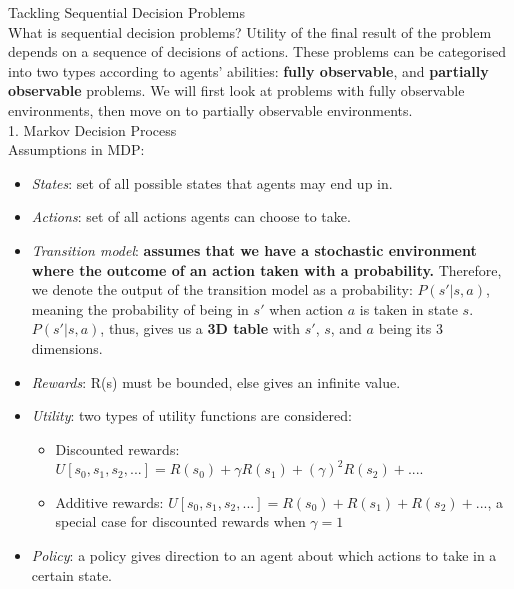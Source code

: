 \documentclass[12pt]{article}
\begin{document}
\noindent

\noindent
{\large{Tackling Sequential Decision Problems}}\\

\noindent
What is sequential decision problems? Utility of the final result of the problem depends on a sequence of decisions of actions. These problems can be categorised into two types according to agents' abilities: \textbf{fully observable}, and \textbf{partially observable} problems. We will first look at problems with fully observable environments, then move on to partially observable environments.\\

\noindent
{\large{1. Markov Decision Process}}\\

Assumptions in MDP:
\begin{tcolorbox}
\begin{itemize}

\item \textsl{States}: set of all possible states that agents may end up in. 
\item \textsl{Actions}: set of all actions agents can choose to take.
\item \textsl{Transition model}: \textbf{assumes that we have a stochastic environment where the outcome of an action taken with a probability.} Therefore, we denote the output of the transition model as a probability: $P(s'| s, a)$, meaning the probability of being in $s'$ when action $a$ is taken in state $s$. $P(s'| s, a)$, thus, gives us a \textbf{3D table} with $s'$, $s$, and $a$ being its 3 dimensions.
			
\item \textsl{Rewards}: R(s) must be bounded, else gives an infinite value. 		
			
\item \textsl{Utility}: two types of utility functions are considered:  
\begin{itemize}
\item Discounted rewards: $U[s_0, s_1, s_2, ...] = R(s_0) + \gamma R(s_1) + (\gamma)^2 R(s_2) + ...$.
\item Additive rewards: $U[s_0, s_1, s_2, ...] = R(s_0) + R(s_1) + R(s_2) + ...$, a special case for discounted rewards when $\gamma  = 1$
\end{itemize}
 
\item \textsl{Policy}: a policy gives direction to an agent about which actions to take in a certain state. 

\end{itemize}
\end{tcolorbox}
\end{document}

